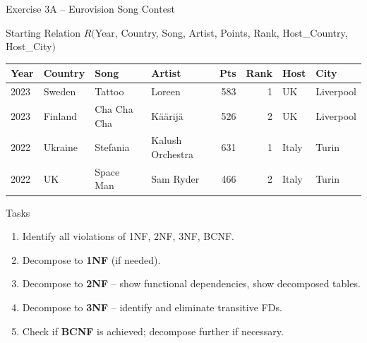 \documentclass[10pt]{beamer}
\begin{document}
\begin{frame}{Exercise 3A -- Eurovision Song Contest}
  \begin{block}{Starting Relation}
    $R($Year, Country, Song, Artist, Points, Rank, Host\_Country, Host\_City$)$
  \end{block}

  \small
  \begin{tabular}{|l|l|l|l|r|r|l|l|}
    \hline
    \textbf{Year} & \textbf{Country} & \textbf{Song} & \textbf{Artist} & \textbf{Pts} & \textbf{Rank} & \textbf{Host} & \textbf{City} \\
    \hline
    2023 & Sweden  & Tattoo      & Loreen           & 583 & 1 & UK    & Liverpool \\
    2023 & Finland & Cha Cha Cha & K\"{a}\"{a}rij\"{a}           & 526 & 2 & UK    & Liverpool \\
    2022 & Ukraine & Stefania    & Kalush Orchestra & 631 & 1 & Italy & Turin     \\
    2022 & UK      & Space Man   & Sam Ryder        & 466 & 2 & Italy & Turin     \\
    \hline
  \end{tabular}

  \vspace{6pt}
  \begin{block}{Tasks}
    \begin{enumerate}
      \item Identify all violations of 1NF, 2NF, 3NF, BCNF.
      \item Decompose to \textbf{1NF} (if needed).
      \item Decompose to \textbf{2NF} -- show functional dependencies, show decomposed tables.
      \item Decompose to \textbf{3NF} -- identify and eliminate transitive FDs.
      \item Check if \textbf{BCNF} is achieved; decompose further if necessary.
    \end{enumerate}
  \end{block}
\end{frame}
\end{document}
